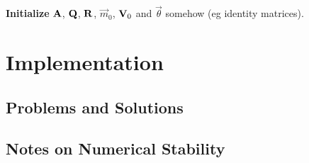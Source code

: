 	\begin{algorithm}  \DontPrintSemicolon
		\textbf{Initialize} \(\boldsymbol{\mathrm{A}}\), \(\boldsymbol{\mathrm{Q}}\), \(\boldsymbol{\mathrm{R}}\), \(\vec{m}_0\), \(\boldsymbol{\mathrm{V}}_0\) and \(\vec{\theta}\) somehow (\ac{eg} identity matrices). \;
		\caption{\algname}
		\label{alg:ngk}
	\end{algorithm}

\section{Implementation}


	\subsection{Problems and Solutions}

	\subsection{Notes on Numerical Stability}
